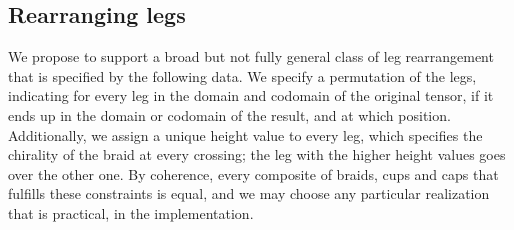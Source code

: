 \subsection{Rearranging legs}
\label{subsec:nonabelian:tensors:rearranging_legs}

We propose to support a broad but not fully general class of leg rearrangement that is specified by the following data.
%
We specify a permutation of the legs, indicating for every leg in the domain and codomain of the original tensor, if it ends up in the domain or codomain of the result, and at which position.
%
Additionally, we assign a unique height value to every leg, which specifies the chirality of the braid at every crossing; the leg with the higher height values goes over the other one.
%
By coherence, every composite of braids, cups and caps that fulfills these constraints is equal, and we may choose any particular realization that is practical, in the implementation. 
%

